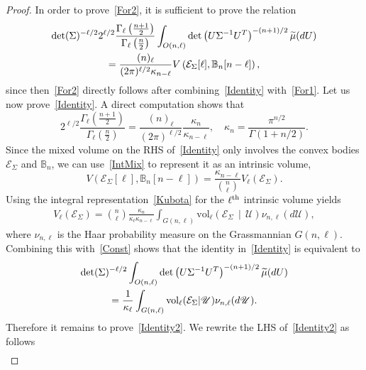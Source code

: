 \documentclass[10pt]{amsart}
\theoremstyle{definition}\newtheorem{defi}[theo]{Definition}\newtheorem{rema}[theo]{Remark}\newtheorem{exam}[theo]{Example}\newtheorem{exem}[theo]{Example}\newtheorem{nota}[theo]{Notation}
\newcommand{\scU}{\mathscr{U}}
\newcommand{\rvol}{\mathrm{vol}}
\newcommand{\clE}{\mathcal{E}}
\newcommand{\bbB}{\mathbb{B}}
\let\oldtilde\tilde
\renewcommand*{\tilde}[1]{\mathchoice{\widetilde{#1}}{\widetilde{#1}}{\oldtilde{#1}}{\oldtilde{#1}}}
\begin{document}
\begin{proof}
In order to prove~\eqref{For2}, it is sufficient to prove the relation
\begin{multline}\label{Identity}
\det(\Sigma)^{-\ell/2} 2^{\ell/2} \frac{\Gamma_{\ell}\left(\frac{n+1}{2}\right)}{\Gamma_{\ell}\left(\frac{n}{2}\right)}
\int_{O(n,\ell)} \det\left(U\Sigma^{-1}U^T\right)^{-(n+1)/2} \tilde{\mu}(dU)\\
= \frac{(n)_{\ell} }{(2\pi)^{\ell/2} \kappa_{n-\ell}} V\left(\clE_{\Sigma}[\ell],\bbB_n[n-\ell]\right),
\end{multline}
since then~\eqref{For2} directly follows after combining~\eqref{Identity} with~\eqref{For1}. Let us now prove~\eqref{Identity}. A direct computation shows that
\begin{equation}\label{Const}
2^{\ell/2} \frac{\Gamma_{\ell}\left(\frac{n+1}{2}\right)}{\Gamma_{\ell}\left(\frac{n}{2}\right)} = \frac{(n)_{\ell} }{(2\pi)^{\ell/2} } \frac{\kappa_{n}}{\kappa_{n-\ell}}, \quad \kappa_{n}= \frac{\pi^{n/2}}{\Gamma(1+n/2)}.
\end{equation}
Since the mixed volume on the RHS of~\eqref{Identity} only involves the convex bodies $\clE_{\Sigma}$ and $\bbB_n$, we can use~\eqref{IntMix} to represent it as an intrinsic volume,
\begin{equation}\label{RelMI}
V(\clE_{\Sigma}[\ell],\bbB_n[n-\ell]) = \frac{ \kappa_{n-\ell} }{\binom{n}{\ell}} V_{\ell}(\clE_{\Sigma}).
\end{equation}
Using the integral representation~\eqref{Kubota} for the $\ell^{\rm th}$ intrinsic volume yields
\begin{gather*}
V_{\ell}(\clE_{\Sigma}) = \binom{n}{\ell}\frac{\kappa_n}{\kappa_{\ell}\kappa_{n-\ell}}
\int_{G(n,\ell)} \rvol_{\ell}\left(\clE_{\Sigma}\,\middle|\,\scU\right) \nu_{n,\ell}(d\scU),
\end{gather*}
where $\nu_{n,\ell}$ is the Haar probability measure on the Grassmannian $G(n,\ell)$. Combining this with~\eqref{Const} shows that the identity in~\eqref{Identity} is equivalent to
\begin{multline}\label{Identity2}
\det(\Sigma)^{-\ell/2} \int_{O(n,\ell)} \det\left(U\Sigma^{-1}U^T\right)^{-(n+1)/2} \tilde{\mu}(dU)\\ 
= \frac{1}{\kappa_{\ell}} \int_{G(n,\ell)} \rvol_{\ell}(\clE_{\Sigma}|\scU) \nu_{n,\ell}(d\scU).
\end{multline}
Therefore it remains to prove~\eqref{Identity2}. We rewrite the LHS of~\eqref{Identity2} as follows
\begin{gather*}

\end{gather*}
\end{proof}
\end{document}
